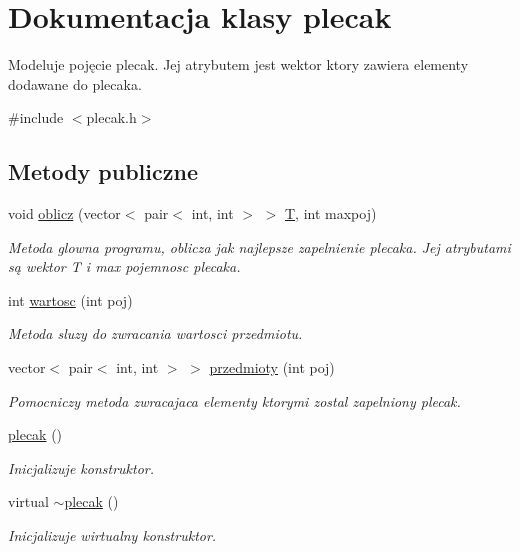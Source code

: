 \hypertarget{classplecak}{\section{Dokumentacja klasy plecak}
\label{classplecak}
}


Modeluje pojęcie plecak. Jej atrybutem jest wektor ktory zawiera elementy dodawane do plecaka.  




{\ttfamily \#include $<$plecak.\-h$>$}

\subsection*{Metody publiczne}
\begin{DoxyCompactItemize}
\item 
void \hyperlink{classplecak_a03475949d5e5613bdeaa2311465fac93}{oblicz} (vector$<$ pair$<$ int, int $>$ $>$ \hyperlink{classplecak_aa4925fd62ae61e120cae3409d97a12bb}{T}, int maxpoj)
\begin{DoxyCompactList}\small\item\em Metoda glowna programu, oblicza jak najlepsze zapelnienie plecaka. Jej atrybutami są wektor T i max pojemnosc plecaka. \end{DoxyCompactList}\item 
int \hyperlink{classplecak_ac71a254ad6907aaf40fe17d845dda799}{wartosc} (int poj)
\begin{DoxyCompactList}\small\item\em Metoda sluzy do zwracania wartosci przedmiotu. \end{DoxyCompactList}\item 
vector$<$ pair$<$ int, int $>$ $>$ \hyperlink{classplecak_a54c09cbd49dc74a905686731575c2fe5}{przedmioty} (int poj)
\begin{DoxyCompactList}\small\item\em Pomocniczy metoda zwracajaca elementy ktorymi zostal zapelniony plecak. \end{DoxyCompactList}\item 
\hyperlink{classplecak_ae4a83a03f80233a82ca1d2d1f963432a}{plecak} ()
\begin{DoxyCompactList}\small\item\em Inicjalizuje konstruktor. \end{DoxyCompactList}\item 
virtual \hyperlink{classplecak_a918a266d6f8e95439b6ba37c1f6b41cf}{$\sim$plecak} ()
\begin{DoxyCompactList}\small\item\em Inicjalizuje wirtualny konstruktor. \end{DoxyCompactList}\end{DoxyCompactItemize}

